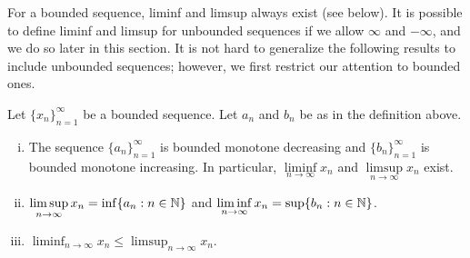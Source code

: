 For a bounded sequence, liminf and limsup always exist (see below).  It is possible
to define liminf and limsup for unbounded sequences if we allow $\infty$
and $-\infty$, and we do so later in this section.
It is not hard to generalize the following results to
include unbounded sequences; however, we first restrict our attention to
bounded ones.

\begin{prop}
Let $\{ x_n \}_{n=1}^\infty$ be a bounded sequence.  Let $a_n$ and $b_n$ be as in
the definition above.
\begin{enumerate}[(i)]
\item
The
sequence $\{ a_n \}_{n=1}^\infty$ is bounded monotone decreasing
and $\{ b_n \}_{n=1}^\infty$ is bounded monotone increasing.  In particular,
$\liminf\limits_{n\to\infty} x_n$ and $\limsup\limits_{n\to\infty} x_n$ exist.
\item
$\displaystyle \limsup_{n \to \infty} x_n = \inf \{ a_n : n \in {\mathbb{N}} \}$
and
$\displaystyle \liminf_{n \to \infty} x_n = \sup \{ b_n : n \in {\mathbb{N}} \}$.
\item
$\displaystyle \liminf_{n \to \infty} x_n \leq \limsup_{n \to \infty} x_n$.
\end{enumerate}
\end{prop}

